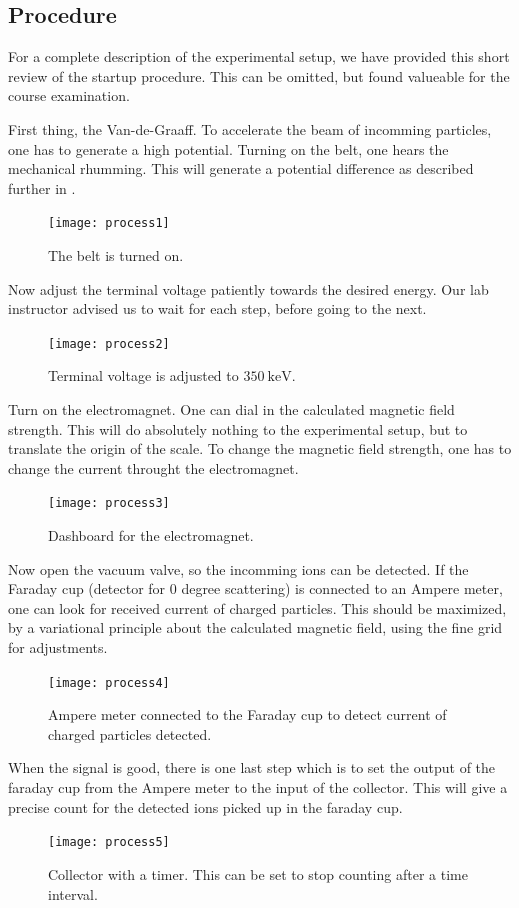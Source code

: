 \subsection{Procedure}\label{sec_procedure}
For a complete description of the experimental setup, we have provided this
short review of the startup procedure. This can be omitted, but found valueable
for the course examination.

First thing, the Van-de-Graaff. To accelerate the beam of incomming particles,
one has to generate a high potential. Turning on the belt, one hears the
mechanical rhumming. This will generate a potential difference as described
further in \cite[p. 565]{krane}.
\begin{figure}[h!]
\centering
\texttt{[image: process1]}
\caption{The belt is turned on.}
\label{fig_process1}
\end{figure}

Now adjust the terminal voltage patiently towards the desired energy. Our lab
instructor advised us to wait for each step, before going to the next.
\begin{figure}[h!]
\centering
\texttt{[image: process2]}
\caption{Terminal voltage is adjusted to $\SI{350}{\kilo\electronvolt}$.}
\label{fig_process2}
\end{figure}

Turn on the electromagnet. One can dial in the calculated magnetic field
strength. This will do absolutely nothing to the experimental setup, but to
translate the origin of the scale. To change the magnetic field strength, one
has to change the current throught the electromagnet.
\begin{figure}[h!]
\centering
\texttt{[image: process3]}
\caption{Dashboard for the electromagnet.}
\label{fig_process3}
\end{figure}

Now open the vacuum valve, so the incomming ions can be detected.
If the Faraday cup (detector for $0$ degree scattering) is connected to an Ampere
meter, one can look for received current of charged particles. This should be
maximized, by a variational principle about the calculated magnetic field,
using the fine grid for adjustments.

\begin{figure}[h!]
\centering
\texttt{[image: process4]}
\caption{Ampere meter connected to the Faraday cup to detect current of charged
particles detected.}
\label{fig_process4}
\end{figure}
When the signal is good, there is one last step which is to set the output of
the faraday cup from the Ampere meter to the input of the collector. This will
give a precise count for the detected ions picked up in the faraday cup.
\begin{figure}[b]
\centering
\texttt{[image: process5]}
\caption{Collector with a timer. This can be set to stop counting after a time
interval.}
\label{fig_process5}
\end{figure}







